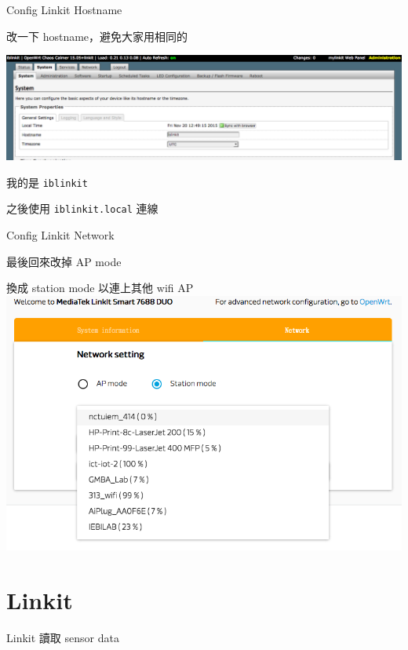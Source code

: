 \documentclass{beamer}
\begin{document}
\begin{frame}[fragile]{Config Linkit Hostname}
  \Large
  \begin{center}
    改一下 hostname，避免大家用相同的
  \end{center}

  \includegraphics[scale=0.25]{./img/hostname.png}

  \begin{center}
    我的是 \verb`iblinkit`

    之後使用 \verb`iblinkit.local` 連線
  \end{center}
\end{frame}

\begin{frame}{Config Linkit Network}
  \Large
  \begin{center}
    最後回來改掉 AP mode

    換成 station mode 以連上其他 wifi AP
    \includegraphics[scale=0.3]{./img/connect_wifi.png}
  \end{center}
\end{frame}

\section{Linkit}

\begin{frame}
  \begin{center}
    \Huge
    Linkit 讀取 sensor data
  \end{center}
\end{frame}
\end{document}
